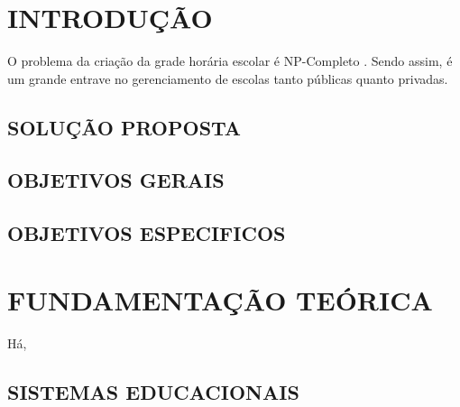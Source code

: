 \documentclass[12pt,a4paper]{article}
\begin{document}
	\begingroup
		\let\clearpage\relax
		\vspace{-1cm} %
		\tableofcontents
	\endgroup

	\newpage


	\section{INTRODUÇÃO}

		O problema da criação da grade horária escolar é NP-Completo \cite{complexity}. Sendo assim, é um grande entrave no gerenciamento de escolas tanto públicas quanto privadas.

		\subsection{SOLUÇÃO PROPOSTA}

			\lipsum[1]


		\subsection{OBJETIVOS GERAIS}

			\lipsum[1]


		\subsection{OBJETIVOS ESPECIFICOS}

			\lipsum[1]

	\newpage


	\section{FUNDAMENTAÇÃO TEÓRICA}


		Há,


		\subsection{SISTEMAS EDUCACIONAIS}
\end{document}
